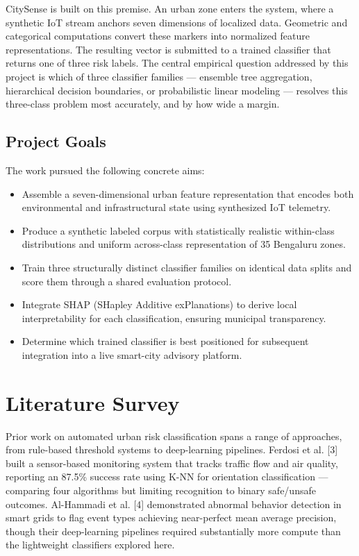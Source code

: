 \documentclass[conference]{IEEEtran}
\begin{document}
CitySense is built on this premise. An urban zone enters the system, where a synthetic IoT stream anchors seven dimensions of localized data. Geometric and categorical computations convert these markers into normalized feature representations. The resulting vector is submitted to a trained classifier that returns one of three risk labels. The central empirical question addressed by this project is which of three classifier families --- ensemble tree aggregation, hierarchical decision boundaries, or probabilistic linear modeling --- resolves this three-class problem most accurately, and by how wide a margin.

\subsection{Project Goals}
The work pursued the following concrete aims:
\begin{itemize}
    \item Assemble a seven-dimensional urban feature representation that encodes both environmental and infrastructural state using synthesized IoT telemetry.
    \item Produce a synthetic labeled corpus with statistically realistic within-class distributions and uniform across-class representation of 35 Bengaluru zones.
    \item Train three structurally distinct classifier families on identical data splits and score them through a shared evaluation protocol.
    \item Integrate SHAP (SHapley Additive exPlanations) to derive local interpretability for each classification, ensuring municipal transparency.
    \item Determine which trained classifier is best positioned for subsequent integration into a live smart-city advisory platform.
\end{itemize}

\section{Literature Survey}
Prior work on automated urban risk classification spans a range of approaches, from rule-based threshold systems to deep-learning pipelines. Ferdosi et al. [3] built a sensor-based monitoring system that tracks traffic flow and air quality, reporting an 87.5\% success rate using K-NN for orientation classification --- comparing four algorithms but limiting recognition to binary safe/unsafe outcomes. Al-Hammadi et al. [4] demonstrated abnormal behavior detection in smart grids to flag event types achieving near-perfect mean average precision, though their deep-learning pipelines required substantially more compute than the lightweight classifiers explored here.
\end{document}
